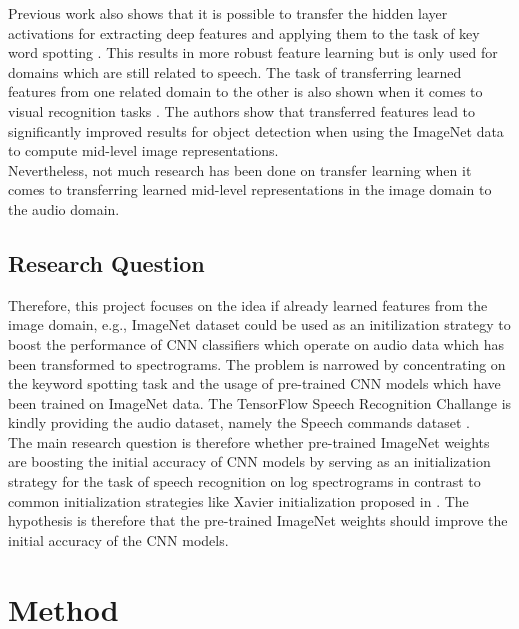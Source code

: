 \documentclass{article}
\theoremstyle{definition}
\theoremstyle{remark}
\begin{document}
Previous work also shows that it is possible to transfer the hidden layer activations for extracting deep features and applying them to the task of key word spotting \cite{retsinas2018transferable}. This results in more robust feature learning but is only used for domains which are still related to speech. The task of transferring learned features from one related domain to the other is also shown when it comes to visual recognition tasks \cite{oquab2014learning}. The authors show that transferred features lead to significantly improved results for object detection when using the ImageNet data to compute mid-level image representations.\\

Nevertheless, not much research has been done on transfer learning when it comes to transferring learned mid-level representations in the image domain to the audio domain.\\




\subsection{Research Question}


Therefore, this project focuses on the idea if already learned features from the image domain, e.g., ImageNet dataset could be used as an initilization strategy to boost the performance of CNN classifiers which operate on audio data which has been transformed to spectrograms. The problem is narrowed by concentrating on the keyword spotting task and the usage of pre-trained CNN models which have been trained on ImageNet data. The TensorFlow Speech Recognition Challange \cite{kaggle_challenge} is kindly providing the audio dataset, namely the Speech commands dataset \cite{scd_v1}.\\

The main research question is therefore whether pre-trained ImageNet weights are boosting the initial accuracy of CNN models by serving as an initialization strategy for the task of speech recognition on log spectrograms in contrast to common initialization strategies like Xavier initialization proposed in \cite{gouda2018speech}. The hypothesis is therefore that the pre-trained ImageNet weights should improve the initial accuracy of the CNN models.\\


\section{Method}
\end{document}
